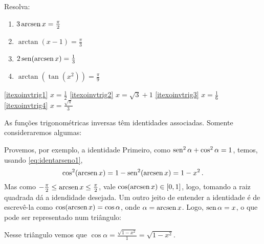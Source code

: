 \begin{exo}
Resolva:
\begin{multicols}{3}
\begin{enumerate}
\item\label{itexoinvtrig1} $3\operatorname{arcsen} x=\tfrac{\pi}{2}$
\item\label{itexoinvtrig2} $\arctan (x-1)=\tfrac{\pi}{3}$
\item\label{itexoinvtrig3} $2\operatorname{sen} (\operatorname{arcsen} x)=\tfrac13$
\item\label{itexoinvtrig4} $\arctan(\tan (x^2))=\tfrac{\pi}{9}$
\end{enumerate}
\end{multicols}
\vspace{0.01cm}
\begin{sol}
\eqref{itexoinvtrig1} $x=\frac{1}{2}$
\eqref{itexoinvtrig2} $x=\sqrt{3}+1$
\eqref{itexoinvtrig3} $x=\tfrac16$
\eqref{itexoinvtrig4} $x=\tfrac{\sqrt{\pi}}{3}$
\end{sol}
\end{exo}

As funções trigonométricas inversas têm identidades associadas. Somente consideraremos algumas:
\begin{ex}\label{Ex:identidadesenoinverso}
Provemos, por exemplo, a identidade
Primeiro, como
$\operatorname{sen}^2\alpha+\cos^2\alpha=1$, temos, usando \eqref{eq:identarseno1}, 
$$\cos^2(\operatorname{arcsen}
x)=1-\operatorname{sen}^2(\operatorname{arcsen} x)=1-x^2\,.$$
Mas como $-\tfrac{\pi}{2}\leq \operatorname{arcsen} x\leq \tfrac{\pi}{2}$, vale 
$\cos(\operatorname{arcsen} x)\in [0,1]$, logo, tomando a raiz quadrada dá a 
idendidade desejada.
Um outro jeito de entender a identidade é de escrevê-la como 
$\cos(\operatorname{arcsen} x)=\cos \alpha$, onde 
 $\alpha=\operatorname{arcsen} x$. Logo, $\operatorname{sen} \alpha=x$, o que pode ser representado 
num triângulo:

\begin{center}
\begin{bmlimage}\end{bmlimage}
\end{center}
Nesse triângulo vemos que $\cos \alpha=\tfrac{\sqrt{1-x^2}}{1}=\sqrt{1-x^2}$.
\end{ex}

